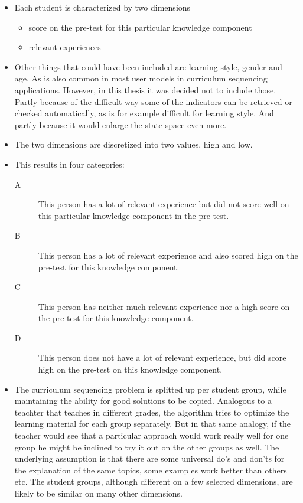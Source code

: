 \begin{itemize}
	\item Each student is characterized by two dimensions
		\begin{itemize}
			\item score on the pre-test for this particular knowledge component
			\item relevant experiences
		\end{itemize}
	\item Other things that could have been included are learning
		style, gender and age. As is also common in most user models in
		curriculum sequencing applications. However, in this thesis it
		was decided not to include those. Partly because of the
		difficult way some of the indicators can be retrieved or
		checked automatically, as is for example difficult for learning
		style. And partly because it would enlarge the state space even
		more.
	\item The two dimensions are discretized into two values, high and low.
	\item This results in four categories:
		\begin{description}
			\item[A] This person has a lot of relevant experience but did not
				score well on this particular knowledge component in the
				pre-test.
			\item[B] This person has a lot of relevant experience and also
				scored high on the pre-test for this knowledge component.
			\item[C] This person has neither much relevant experience nor
				a high score on the pre-test for this knowledge component.
			\item[D] This person does not have a lot of relevant experience,
				but did score high on the pre-test on this knowledge component.
		\end{description}
	\item The curriculum sequencing problem is splitted up per student group,
		while maintaining the ability for good solutions to be copied.
		Analogous to a teachter that teaches in different grades, the algorithm
		tries to optimize the learning material for each group separately. But
		in that same analogy, if the teacher would see that a particular
		approach would work really well for one group he might be inclined to
		try it out on the other groups as well. The underlying assumption is
		that there are some universal do's and don'ts for the explanation of
		the same topics, some examples work better than others etc. The student
		groups, although different on a few selected dimensions, are likely to
		be similar on many other dimensions.
\end{itemize}

